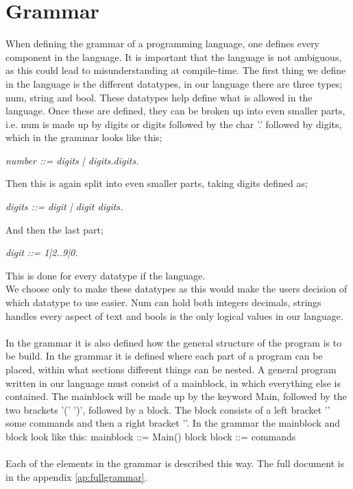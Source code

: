 \section{Grammar}
When defining the grammar of a programming language, one defines every component in the language. It is important that the language is not ambiguous, as this could lead to misunderstanding at compile-time.
The first thing we define in the language is the different datatypes, in our language there are three types; num, string and bool. These datatypes help define what is allowed in the language.
Once these are defined, they can be broken up into even smaller parts, i.e. num is made up by digits or digits followed by the char '.' followed by digits, which in the grammar looks like this;\\
\begin{center}
\textit{number ::= digits | digits.digits.}\\
\end{center}
Then this is again split into even smaller parts, taking digits defined as; \\
\begin{center}
\textsl{digits ::= digit | digit digits.}\\
\end{center}
And then the last part;
\begin{center}
\textsl{digit ::= 1|2..9|0.} \\
\end{center}
This is done for every datatype if the language.\\
We choose only to make these datatypes as this would make the users decision of which datatype to use easier. Num can hold both integers decimals, strings handles every aspect of text and bools is the only logical values in our language.\\
\\
In the grammar it is also defined how the general structure of the program is to be build. In the grammar it is defined where each part of a program can be placed, within what sections different things can be nested. A general program written in our language must consist of a mainblock, in which everything else is contained. The mainblock will be made up by the keyword Main, followed by the two brackets '(' ')', followed by a block.
The block consists of a left bracket '{' some commands and then a right bracket '}'. In the grammar the mainblock and block look like this: mainblock ::= Main() block
block ::= { commands }\\
\\
Each of the elements in the grammar is described this way. The full document is in the appendix \ref{ap:fullgrammar}.